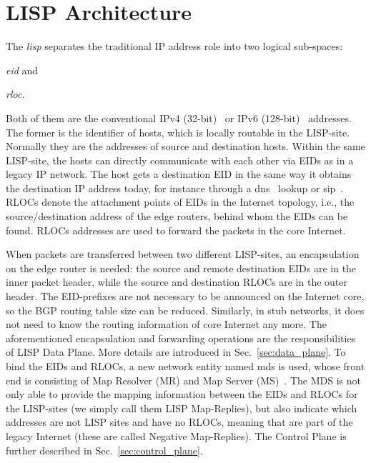 \section{LISP Architecture}
\label{sec:background_lisp}

The \emph{\acrfull{lisp}} separates the traditional IP address role into two logical sub-spaces:
\begin{inparaenum}[(i)]
	\item \emph{\acrfull{eid}} and
	\item \emph{\acrfull{rloc}}.
\end{inparaenum}
Both of them are the conventional IPv4 (32-bit)~\cite{rfc07911981internet} or IPv6 (128-bit)~\cite{deering1998rfc} addresses. The former is the identifier of hosts, which is locally routable in the LISP-site. Normally they are the addresses of source and destination hosts. Within the same LISP-site, the hosts can directly communicate with each other via EIDs as in a legacy IP network. The host gets a destination EID in the same way it obtains the destination IP address today, for instance through a \acrfull{dns}~\cite{mockapetrisrfc} lookup or \acrfull{sip}~\cite{rosenbergsip}. RLOCs denote the attachment points of EIDs in the Internet topology, i.e., the source/destination address of the edge routers, behind whom the EIDs can be found. RLOCs addresses are used to forward the packets in the core Internet. 

When packets are transferred between two different LISP-sites, an encapsulation on the edge router is needed: the source and remote destination EIDs are in the inner packet header, while the source and destination RLOCs are in the outer header. %
The EID-prefixes are not necessary to be announced on the Internet core, so the BGP routing table size can be reduced. Similarly, in stub networks, it does not need to know the routing information of core Internet any more. The aforementioned encapsulation and forwarding operations are the responsibilities of LISP Data Plane. More details are introduced in Sec.~\ref{sec:data_plane}. To bind the EIDs and RLOCs, a new network entity named \acrfull{mds} is used, whose front end is consisting of Map Resolver (MR) and Map Server (MS)~\cite{rfc6833}. The MDS is not only able to provide the mapping information between the EIDs and RLOCs for the LISP-sites (we simply call them LISP Map-Replies), but also indicate which addresses are not LISP sites and have no RLOCs, meaning that are part of the legacy Internet (these are called Negative Map-Replies). The Control Plane is further described in Sec.~\ref{sec:control_plane}.


